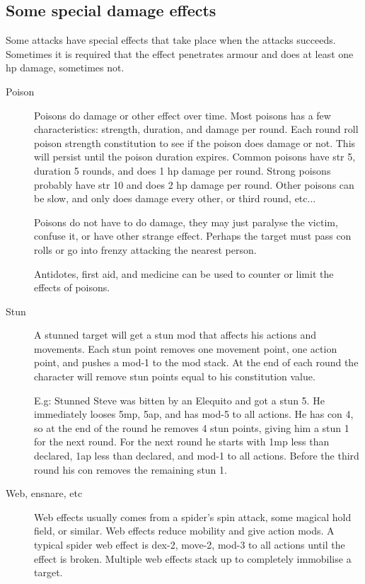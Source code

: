 \subsection*{Some special damage effects}
Some attacks have special effects that take place when the attacks succeeds. Sometimes it is required that the effect penetrates armour and does at least one hp damage, sometimes not.


\begin{description}


\item[Poison]
Poisons do damage or other effect over time. Most poisons has a few characteristics: strength, duration, and damage per round. Each round roll poison strength \vs constitution to see if the poison does damage or not. This will persist until the poison duration expires. Common poisons have str 5, duration 5 rounds, and does 1 hp damage per round. Strong poisons probably have str 10 and does 2 hp damage per round. Other poisons can be slow, and only does damage every other, or third round, etc...

Poisons do not have to do damage, they may just paralyse the victim, confuse it, or have other strange effect. Perhaps the target must pass con rolls or go into frenzy attacking the nearest person.

Antidotes, first aid, and medicine can be used to counter or limit the effects of poisons.


\item[Stun]
A stunned target will get a stun mod that affects his actions and movements. Each stun point removes one movement point, one action point, and pushes a mod-1 to the mod stack. At the end of each round the character will remove stun points equal to his constitution value.

E.g: Stunned Steve was bitten by an Elequito and got a stun 5. He immediately looses 5mp, 5ap, and has mod-5 to all actions. He has con 4, so at the end of the round he removes 4 stun points, giving him a stun 1 for the next round. For the next round he starts with 1mp less than declared, 1ap less than declared, and mod-1 to all actions. Before the third round his con removes the remaining stun 1.


\item[Web, ensnare, etc]
Web effects usually comes from a spider's spin attack, some magical hold field, or similar. Web effects reduce mobility and give action mods.
A typical spider web effect is dex-2, move-2, mod-3 to all actions until the effect is broken. Multiple web effects stack up to completely immobilise a target.


\end{description}
